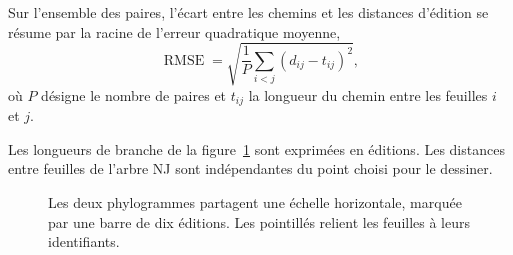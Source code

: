 Sur l’ensemble des paires, l’écart entre les chemins et les distances d’édition se résume par la racine de l’erreur quadratique moyenne,
\[
 \operatorname{RMSE}=\sqrt{\frac{1}{P}\sum_{i<j}(d_{ij}-t_{ij})^2},
\]
où \(P\) désigne le nombre de paires et \(t_{ij}\) la longueur du chemin entre les feuilles \(i\) et \(j\).

Les longueurs de branche de la figure~\ref{fig:arbres} sont exprimées en éditions. Les distances entre feuilles de l’arbre NJ sont indépendantes du point choisi pour le dessiner.

\begin{figure}[!htbp]\centering
\resizebox{!}{.68\textheight}{}
\caption{Les deux phylogrammes partagent une échelle horizontale, marquée par une barre de dix éditions. Les pointillés relient les feuilles à leurs identifiants.}\label{fig:arbres}
\end{figure}
\FloatBarrier


\FloatBarrier


